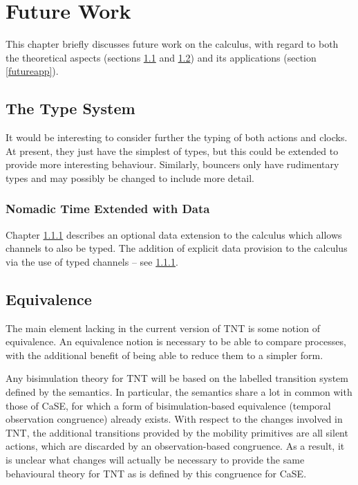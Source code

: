 \chapter{Future Work}
\label{futurework}

This chapter briefly discusses future work on the calculus, with regard
to both the theoretical aspects (sections \ref{futuretypes} and
\ref{futureequiv}) and its applications (section \ref{futureapp}).

\section{The Type System}
\label{futuretypes}

It would be interesting to consider further the
typing of both actions and clocks.  At present, they just have the
simplest of types, but this could be extended to provide more
interesting behaviour.  Similarly, bouncers only have rudimentary types
and may possibly be changed to include more detail.

\subsection{Nomadic Time Extended with Data}
\label{tnted}
Chapter \ref{tnted} describes an optional data extension to the
calculus which allows channels to also be typed.
The addition of explicit data provision to the calculus via the
  use of typed channels -- see \ref{tnted}.

\section{Equivalence}
\label{futureequiv}

The main element lacking in the current version of TNT is some notion of
equivalence.  An equivalence notion is necessary to be able to compare
processes, with the additional benefit of being able to reduce them to a
simpler form.

Any bisimulation theory for TNT will be based on the labelled transition
system defined by the semantics.  In particular, the semantics share a
lot in common with those of CaSE, for which a form of bisimulation-based
equivalence (temporal observation congruence) already exists.  With
respect to the changes involved in TNT, the additional transitions
provided by the mobility primitives are all silent actions, which are
discarded by an observation-based congruence.  As a result, it is
unclear what changes will actually be necessary to provide the same
behavioural theory for TNT as is defined by this congruence for CaSE.


